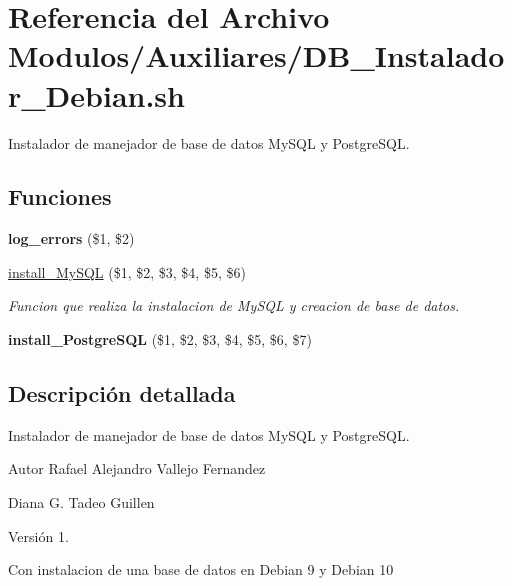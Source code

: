 \hypertarget{DB__Instalador__Debian_8sh}{}\section{Referencia del Archivo Modulos/\+Auxiliares/\+D\+B\+\_\+\+Instalador\+\_\+\+Debian.sh}
\label{DB__Instalador__Debian_8sh}


Instalador de manejador de base de datos My\+S\+QL y Postgre\+S\+QL.  


\subsection*{Funciones}
\begin{DoxyCompactItemize}
\item 
\mbox{\label{DB__Instalador__Debian_8sh_a92067b58a8478c9841b2cd9b75ea3565}} 
{\bfseries log\+\_\+errors} (\$1, \$2)
\item 
\hyperlink{DB__Instalador__Debian_8sh_ac8bff836d4f7d263dbcf02890f2c025d}{install\+\_\+\+My\+S\+QL} (\$1, \$2, \$3, \$4, \$5, \$6)
\begin{DoxyCompactList}\small\item\em Funcion que realiza la instalacion de My\+S\+QL y creacion de base de datos. \end{DoxyCompactList}\item 
\mbox{\label{DB__Instalador__Debian_8sh_a56ea9a82dabc1a9f02e4d35cec23e802}} 
{\bfseries install\+\_\+\+Postgre\+S\+QL} (\$1, \$2, \$3, \$4, \$5, \$6, \$7)
\end{DoxyCompactItemize}


\subsection{Descripción detallada}
Instalador de manejador de base de datos My\+S\+QL y Postgre\+S\+QL. 

\begin{DoxyAuthor}{Autor}
Rafael Alejandro Vallejo Fernandez 

Diana G. Tadeo Guillen 
\end{DoxyAuthor}
\begin{DoxyVersion}{Versión}
1.
\end{DoxyVersion}
Con instalacion de una base de datos en Debian 9 y Debian 10 

